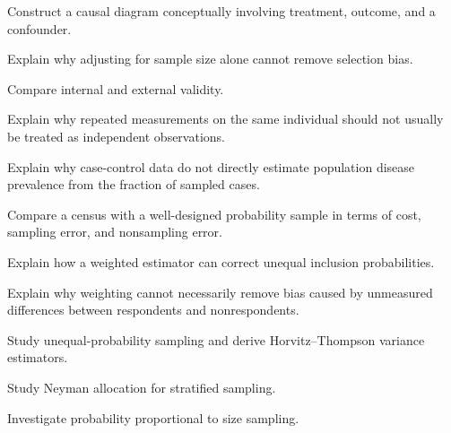 \begin{exercise}[3]
Construct a causal diagram conceptually involving treatment, outcome,
and a confounder.
\end{exercise}

\begin{exercise}[3]
Explain why adjusting for sample size alone cannot remove selection
bias.
\end{exercise}

\begin{exercise}[3]
Compare internal and external validity.
\end{exercise}

\begin{exercise}[3]
Explain why repeated measurements on the same individual should not
usually be treated as independent observations.
\end{exercise}

\begin{exercise}[3]
Explain why case-control data do not directly estimate population disease
prevalence from the fraction of sampled cases.
\end{exercise}

\begin{exercise}[3]
Compare a census with a well-designed probability sample in terms of
cost, sampling error, and nonsampling error.
\end{exercise}

\begin{exercise}[3]
Explain how a weighted estimator can correct unequal inclusion
probabilities.
\end{exercise}

\begin{exercise}[3]
Explain why weighting cannot necessarily remove bias caused by unmeasured
differences between respondents and nonrespondents.
\end{exercise}

\begin{exercise}[4]
Study unequal-probability sampling and derive Horvitz--Thompson variance
estimators.
\end{exercise}

\begin{exercise}[4]
Study Neyman allocation for stratified sampling.
\end{exercise}

\begin{exercise}[4]
Investigate probability proportional to size sampling.
\end{exercise}

